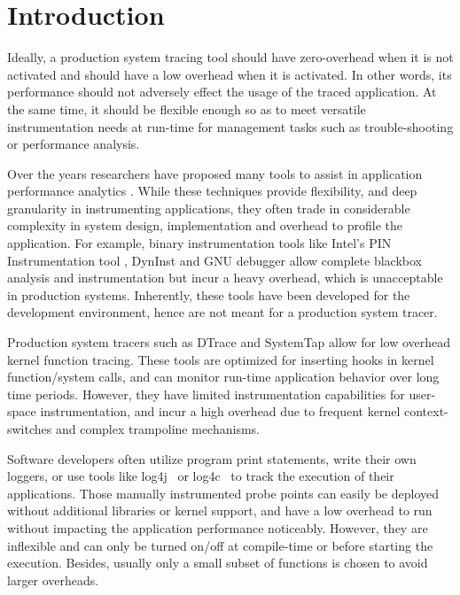\section{Introduction}
\label{sec:intro}

Ideally, a production system tracing tool should have zero-overhead when it is not activated and should have a low overhead when it is activated. 
In other words, its performance should not adversely effect the usage of the traced application. 
At the same time, it should be flexible enough so as to meet versatile instrumentation needs at run-time for management tasks such as trouble-shooting or performance analysis.

Over the years researchers have proposed many tools to assist in application performance analytics \cite{pin,gdb,dtrace,systemtap,lttng,utrace,ptrace,dyninst}.
While these techniques provide flexibility, and deep granularity in instrumenting applications, they often trade in considerable complexity in system design, implementation and overhead to profile the application. 
For example, binary instrumentation tools like Intel's PIN Instrumentation tool \cite{pin}, DynInst \cite{dyninst} and GNU debugger \cite{gdb} allow complete blackbox analysis and instrumentation but incur a heavy overhead, which is unacceptable in production systems. 
Inherently, these tools have been developed for the development environment, hence are not meant for a production system tracer.

Production system tracers such as DTrace\cite{dtrace} and SystemTap\cite{systemtap} allow for low overhead kernel function tracing.
These tools are optimized for inserting hooks in kernel function/system calls, and can monitor run-time application behavior over long time periods. 
However, they have limited instrumentation capabilities for user-space instrumentation, and incur a high overhead due to frequent kernel context-switches and complex trampoline mechanisms.

Software developers often utilize program print statements, write their own loggers, or use tools like log4j~\cite{log4j} or log4c~\cite{log4c} to track the execution of their applications.
Those manually instrumented probe points can easily be deployed without additional libraries or kernel support, and have a low overhead to run 
without impacting the application performance noticeably. 
However, they are inflexible and can only be turned on/off at compile-time or before starting the execution. 
Besides, usually only a small subset of functions is chosen to avoid larger overheads.


